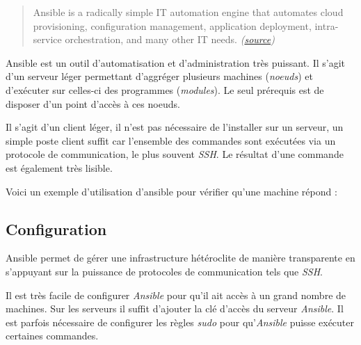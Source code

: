 \bigskip

\begin{quote}
Ansible is a radically simple IT automation engine that automates cloud
provisioning, configuration management, application deployment,
intra-service orchestration, and many other IT needs.
\emph{(\href{https://www.ansible.com/how-ansible-works}{source})}
\end{quote}

\bigskip

Ansible est un outil d'automatisation et d'administration très puissant.
Il s'agit d'un serveur léger permettant d'aggréger plusieurs machines
(\emph{noeuds}) et d'exécuter sur celles-ci des programmes
(\emph{modules}). Le seul prérequis est de disposer d'un point d'accès à
ces noeuds.

\bigskip

Il s'agit d'un client léger, il n'est pas nécessaire de l'installer sur
un serveur, un simple poste client suffit car l'ensemble des commandes
sont exécutées via un protocole de communication, le plus souvent
\emph{SSH}. Le résultat d'une commande est également très lisible.

\bigskip

Voici un exemple d'utilisation d'ansible pour vérifier qu'une machine
répond :

\begin{Shaded}
\begin{Highlighting}[]
\NormalTok{$ } 
 \KeywordTok{|}  \NormalTok{=}\KeywordTok{>} \NormalTok{\{}
    \NormalTok{: }\NormalTok{,}
    \NormalTok{: }
\NormalTok{\}}
\end{Highlighting}
\end{Shaded}

\newpage

\subsection{Configuration}\label{configuration}

\bigskip

Ansible permet de gérer une infrastructure hétéroclite de manière
transparente en s'appuyant sur la puissance de protocoles de
communication tels que \emph{SSH}.

\bigskip

Il est très facile de configurer \emph{Ansible} pour qu'il ait accès à
un grand nombre de machines. Sur les serveurs il suffit d'ajouter la clé
d'accès du serveur \emph{Ansible}. Il est parfois nécessaire de
configurer les règles \emph{sudo} pour qu'\emph{Ansible} puisse exécuter
certaines commandes.

